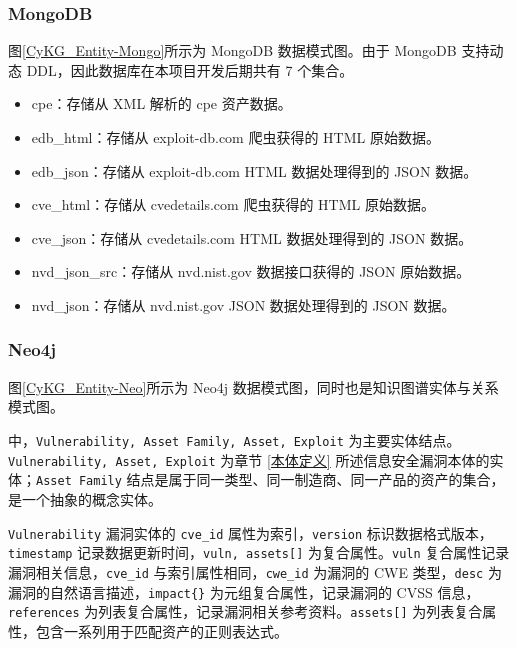\documentclass[a4paper,AutoFakeBold,oneside,12pt]{book}
\begin{document}
\subsubsection{MongoDB}

图\ref{CyKG_Entity-Mongo}所示为 MongoDB 数据模式图。由于 MongoDB 支持动态 DDL，因此数据库在本项目开发后期共有 7 个集合。
\begin{itemize}
	\item cpe：存储从 XML 解析的 cpe 资产数据。
	\item edb{\_}html：存储从 exploit-db.com 爬虫获得的 HTML 原始数据。
	\item edb{\_}json：存储从 exploit-db.com HTML 数据处理得到的 JSON 数据。
	\item cve{\_}html：存储从 cvedetails.com 爬虫获得的 HTML 原始数据。
	\item cve{\_}json：存储从 cvedetails.com HTML 数据处理得到的 JSON 数据。
	\item nvd{\_}json{\_}src：存储从 nvd.nist.gov 数据接口获得的 JSON 原始数据。
	\item nvd{\_}json：存储从 nvd.nist.gov JSON 数据处理得到的 JSON 数据。
\end{itemize}


\subsubsection{Neo4j}

图\ref{CyKG_Entity-Neo}所示为 Neo4j 数据模式图，同时也是知识图谱实体与关系模式图。


中，\lstinline|Vulnerability, Asset Family, Asset, Exploit| 为主要实体结点。\lstinline|Vulnerability, Asset, Exploit| 为章节 \ref{本体定义} 所述信息安全漏洞本体的实体；\lstinline|Asset Family| 结点是属于同一类型、同一制造商、同一产品的资产的集合，是一个抽象的概念实体。

\lstinline|Vulnerability| 漏洞实体的 \lstinline|cve_id| 属性为索引，\lstinline|version| 标识数据格式版本，\lstinline|timestamp| 记录数据更新时间，\lstinline|vuln, assets[]| 为复合属性。\lstinline|vuln| 复合属性记录漏洞相关信息，\lstinline|cve_id| 与索引属性相同，\lstinline|cwe_id| 为漏洞的 CWE 类型，\lstinline|desc| 为漏洞的自然语言描述，\lstinline|impact{}| 为元组复合属性，记录漏洞的 CVSS 信息，\lstinline|references| 为列表复合属性，记录漏洞相关参考资料。\lstinline|assets[]| 为列表复合属性，包含一系列用于匹配资产的正则表达式。
\end{document}
